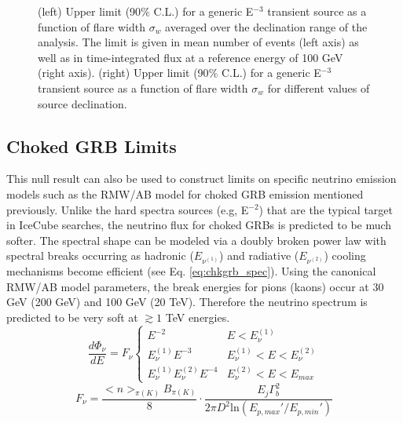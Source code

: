 \documentclass[manuscript]{aastex}
\begin{document}
\begin{figure}[ht]
\caption[Time-integrated Flux Limit for E$^{-3}$ Source]{(left) Upper limit (90$\%$ C.L.) for a generic E$^{-3}$ transient source as a function of flare width $\sigma_w$ averaged over the declination range of the analysis. The limit is given in mean number of events (left axis) as well as in time-integrated flux at a reference energy of 100 GeV (right axis). (right) Upper limit (90$\%$ C.L.) for a generic E$^{-3}$ transient source as a function of flare width $\sigma_w$ for different values of source declination.}
\label{fig:GenericE3Limit}
\end{figure}

\subsection{Choked GRB Limits}
This null result can also be used to construct limits on specific neutrino emission models such as the RMW/AB model for choked GRB emission mentioned previously. Unlike the hard spectra sources (e.g, E$^{-2}$) that are the typical target in IceCube searches, the neutrino flux for choked GRBs is predicted to be much softer. The spectral shape can be modeled via a doubly broken power law with spectral breaks occurring as hadronic ($E_{\nu^{(1)}}$) and radiative ($E_{\nu^{(2)}}$) cooling mechanisms become efficient (see Eq. \ref{eq:chkgrb_spec}). Using the canonical RMW/AB model parameters, the break energies for pions (kaons) occur at 30 GeV (200 GeV) and 100 GeV (20 TeV). Therefore the neutrino spectrum is predicted to be very soft at $\gtrsim 1$ TeV energies.
\begin{equation}\label{eq:chkgrb_spec}
\frac{d\Phi_\nu}{dE}=F_\nu\left\{\begin{array}{cc}
E^{-2} & E < E_{\nu}^{(1)} \\ 
E_{\nu}^{(1)}E^{-3} & E_{\nu}^{(1)}< E < E_{\nu}^{(2)} \\ 
E_{\nu}^{(1)}E_{\nu}^{(2)}E^{-4} & E_{\nu}^{(2)}< E < E_{max}
\end{array}\right.
\end{equation}
\begin{equation}\label{eq:nuflu}
F_{\nu} = \frac{<n>_{\pi(K)}B_{\pi(K)}}{8} \cdot \frac{E_j \Gamma_b^2}{2 \pi D^2 \textrm{ln}(E_{p,max}'/ E_{p,min}')}
\end{equation}
\end{document}
